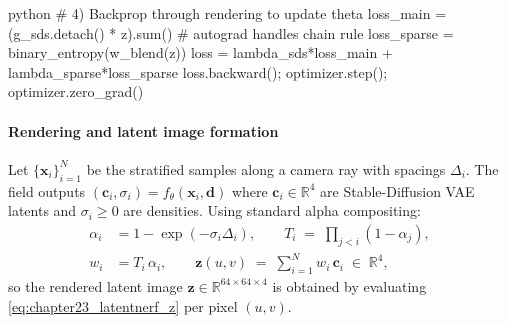 \begin{enrichment}
\begin{enrichment}
\begin{mintedbox}{python}
                    # 4) Backprop through rendering to update theta
                    loss_main   = (g_sds.detach() * z).sum()     # autograd handles chain rule
                    loss_sparse = binary_entropy(w_blend(z))
                    loss        = lambda_sds*loss_main + lambda_sparse*loss_sparse
                    loss.backward(); optimizer.step(); optimizer.zero_grad()
        \end{mintedbox}
        
        \newpage 
        
        \paragraph{Rendering and latent image formation}
        Let $\{\mathbf{x}_i\}_{i=1}^{N}$ be the stratified samples along a camera ray with spacings $\Delta_i$. The field outputs
        $(\mathbf{c}_i,\sigma_i)=f_\theta(\mathbf{x}_i,\mathbf{d})$ where $\mathbf{c}_i\in\mathbb{R}^4$ are Stable-Diffusion VAE latents and $\sigma_i\ge 0$ are densities. Using standard alpha compositing:
        \begin{align}
            \alpha_i &= 1 - \exp(-\sigma_i \Delta_i), \qquad
            T_i \;=\;\prod_{j<i} (1-\alpha_j), \label{eq:chapter23_latentnerf_alphaTi}\\
            w_i &= T_i \,\alpha_i, \qquad
            \mathbf{z}(u,v) \;=\; \sum_{i=1}^{N} w_i \,\mathbf{c}_i \;\in\; \mathbb{R}^{4}, \label{eq:chapter23_latentnerf_z}
        \end{align}
        so the rendered latent image $\mathbf{z}\in\mathbb{R}^{64\times64\times4}$ is obtained by evaluating \eqref{eq:chapter23_latentnerf_z} per pixel $(u,v)$.
        

\end{enrichment}
\end{enrichment}
